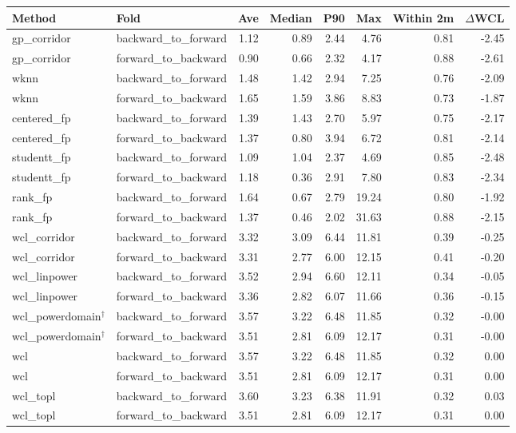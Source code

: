 \begin{tabular}{llrrrrrr}
\toprule
Method & Fold & Ave & Median & P90 & Max & Within 2m & $\Delta$WCL \\
\midrule
gp\_corridor & backward\_to\_forward & 1.12 & 0.89 & 2.44 & 4.76 & 0.81 & -2.45 \\
gp\_corridor & forward\_to\_backward & 0.90 & 0.66 & 2.32 & 4.17 & 0.88 & -2.61 \\
wknn & backward\_to\_forward & 1.48 & 1.42 & 2.94 & 7.25 & 0.76 & -2.09 \\
wknn & forward\_to\_backward & 1.65 & 1.59 & 3.86 & 8.83 & 0.73 & -1.87 \\
centered\_fp & backward\_to\_forward & 1.39 & 1.43 & 2.70 & 5.97 & 0.75 & -2.17 \\
centered\_fp & forward\_to\_backward & 1.37 & 0.80 & 3.94 & 6.72 & 0.81 & -2.14 \\
studentt\_fp & backward\_to\_forward & 1.09 & 1.04 & 2.37 & 4.69 & 0.85 & -2.48 \\
studentt\_fp & forward\_to\_backward & 1.18 & 0.36 & 2.91 & 7.80 & 0.83 & -2.34 \\
rank\_fp & backward\_to\_forward & 1.64 & 0.67 & 2.79 & 19.24 & 0.80 & -1.92 \\
rank\_fp & forward\_to\_backward & 1.37 & 0.46 & 2.02 & 31.63 & 0.88 & -2.15 \\
wcl\_corridor & backward\_to\_forward & 3.32 & 3.09 & 6.44 & 11.81 & 0.39 & -0.25 \\
wcl\_corridor & forward\_to\_backward & 3.31 & 2.77 & 6.00 & 12.15 & 0.41 & -0.20 \\
wcl\_linpower & backward\_to\_forward & 3.52 & 2.94 & 6.60 & 12.11 & 0.34 & -0.05 \\
wcl\_linpower & forward\_to\_backward & 3.36 & 2.82 & 6.07 & 11.66 & 0.36 & -0.15 \\
wcl\_powerdomain$^\dagger$ & backward\_to\_forward & 3.57 & 3.22 & 6.48 & 11.85 & 0.32 & -0.00 \\
wcl\_powerdomain$^\dagger$ & forward\_to\_backward & 3.51 & 2.81 & 6.09 & 12.17 & 0.31 & -0.00 \\
wcl & backward\_to\_forward & 3.57 & 3.22 & 6.48 & 11.85 & 0.32 & 0.00 \\
wcl & forward\_to\_backward & 3.51 & 2.81 & 6.09 & 12.17 & 0.31 & 0.00 \\
wcl\_topl & backward\_to\_forward & 3.60 & 3.23 & 6.38 & 11.91 & 0.32 & 0.03 \\
wcl\_topl & forward\_to\_backward & 3.51 & 2.81 & 6.09 & 12.17 & 0.31 & 0.00 \\

\end{tabular}
